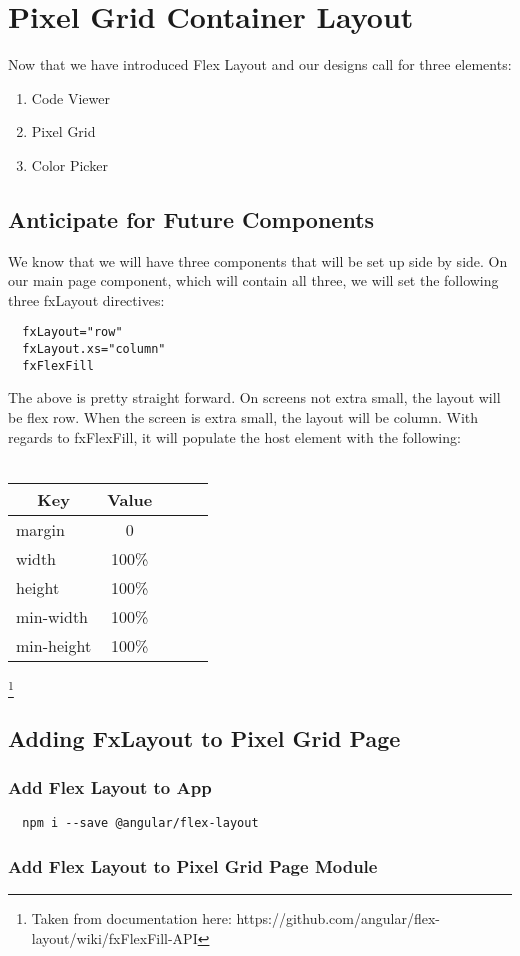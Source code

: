 \maketitle{}
\section{ Pixel Grid Container Layout }

Now that we have introduced Flex Layout and our designs call for three elements:
\begin{enumerate}
  \item Code Viewer
  \item Pixel Grid
  \item Color Picker
\end{enumerate}

\subsection{ Anticipate for Future Components }

We know that we will have three components that will be set up side by side.
On our main page component, which will contain all three, we will set the
following three fxLayout directives:
\begin{verbatim}
  fxLayout="row"
  fxLayout.xs="column"
  fxFlexFill
\end{verbatim}

The above is pretty straight forward. On screens not extra small, the layout
will be flex row. When the screen is extra small, the layout will be column.
With regards to fxFlexFill, it will populate the host element with the following:
\\
\\
\begin{tabular}{@{} l *4c @{}}
\toprule
 \multicolumn{1}{c}{Key} & Value \\
\midrule
 margin & 0         \\
 width  & 100\%     \\
 height & 100\%     \\
 min-width & 100\%  \\
 min-height & 100\% \\
\end{tabular}
\footnote{Taken from documentation here:
https://github.com/angular/flex-layout/wiki/fxFlexFill-API}

\subsection{ Adding FxLayout to Pixel Grid Page }

\subsubsection{ Add Flex Layout to App }
\begin{verbatim}
  npm i --save @angular/flex-layout
\end{verbatim}

\subsubsection{ Add Flex Layout to Pixel Grid Page Module }
